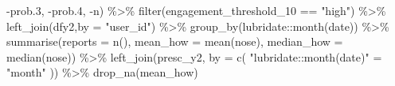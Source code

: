 \documentclass[
]{article}
\newenvironment{Shaded}{\begin{snugshade}}{\end{snugshade}}
\newcommand{\AttributeTok}[1]{\textcolor[rgb]{0.77,0.63,0.00}{#1}}
\newcommand{\FloatTok}[1]{\textcolor[rgb]{0.00,0.00,0.81}{#1}}
\newcommand{\FunctionTok}[1]{\textcolor[rgb]{0.00,0.00,0.00}{#1}}
\newcommand{\NormalTok}[1]{#1}
\newcommand{\OtherTok}[1]{\textcolor[rgb]{0.56,0.35,0.01}{#1}}
\newcommand{\SpecialCharTok}[1]{\textcolor[rgb]{0.00,0.00,0.00}{#1}}
\newcommand{\StringTok}[1]{\textcolor[rgb]{0.31,0.60,0.02}{#1}}
\begin{document}
\begin{Shaded}
\begin{Highlighting}[]
                 \SpecialCharTok{{-}}\NormalTok{prob}\FloatTok{.3}\NormalTok{,}
                 \SpecialCharTok{{-}}\NormalTok{prob}\FloatTok{.4}\NormalTok{,}
                 \SpecialCharTok{{-}}\NormalTok{n) }\SpecialCharTok{\%\textgreater{}\%} 
  \FunctionTok{filter}\NormalTok{(engagement\_threshold\_10 }\SpecialCharTok{==} \StringTok{"high"}\NormalTok{) }\SpecialCharTok{\%\textgreater{}\%}
   \FunctionTok{left\_join}\NormalTok{(dfy2,}\AttributeTok{by =} \StringTok{"user\_id"}\NormalTok{) }\SpecialCharTok{\%\textgreater{}\%}  
   \FunctionTok{group\_by}\NormalTok{(lubridate}\SpecialCharTok{::}\FunctionTok{month}\NormalTok{(date)) }\SpecialCharTok{\%\textgreater{}\%}
   \FunctionTok{summarise}\NormalTok{(}\AttributeTok{reports =} \FunctionTok{n}\NormalTok{(),}
             \AttributeTok{mean\_how =} \FunctionTok{mean}\NormalTok{(nose),}
             \AttributeTok{median\_how =} \FunctionTok{median}\NormalTok{(nose)) }\SpecialCharTok{\%\textgreater{}\%}
   \FunctionTok{left\_join}\NormalTok{(presc\_y2, }\AttributeTok{by =} \FunctionTok{c}\NormalTok{( }\StringTok{"lubridate::month(date)"} \OtherTok{=} \StringTok{"month"}\NormalTok{ )) }\SpecialCharTok{\%\textgreater{}\%} 
   \FunctionTok{drop\_na}\NormalTok{(mean\_how) }




\end{Highlighting}
\end{Shaded}
\end{document}
